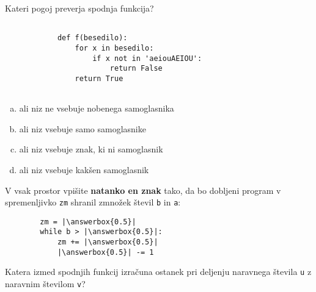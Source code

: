 \documentclass[arhiv, 10pt]{../izpit}
\newcommand{\inlinepy}[1]{\texttt{#1}}
\newcommand{\answerbox}[1]{\framebox{\vphantom{\large M}\hspace{#1cm}}}
\begin{document}
        \naloga*

        \begin{multicols}{2}
        \noindent
        Kateri pogoj preverja spodnja funkcija?
        \begin{verbatim}
        
            def f(besedilo):
                for x in besedilo:
                    if x not in 'aeiouAEIOU':
                        return False
                return True
            
        \end{verbatim}

        \begin{enumerate}[(a)]
\item ali niz ne vsebuje nobenega samoglasnika
\item ali niz vsebuje samo samoglasnike
\item ali niz vsebuje znak, ki ni samoglasnik
\item ali niz vsebuje kakšen samoglasnik
\end{enumerate}

        \end{multicols}
    
        \naloga*
        \begin{multicols}{2}
        \noindent
        V vsak prostor vpišite \textbf{natanko en znak} tako, da bo dobljeni program v spremenljivko \inlinepy{zm} shranil zmnožek števil \inlinepy{b} in \inlinepy{a}:
        
        \columnbreak
        \begin{verbatim}
        zm = |\answerbox{0.5}|
        while b > |\answerbox{0.5}|:
            zm += |\answerbox{0.5}|
            |\answerbox{0.5}| -= 1
        \end{verbatim}
        \end{multicols}
    
        \clearpage
        \naloga
        
        Katera izmed spodnjih funkcij izračuna ostanek pri deljenju naravnega števila \inlinepy{u} z naravnim številom \inlinepy{v}?
    
\end{document}
